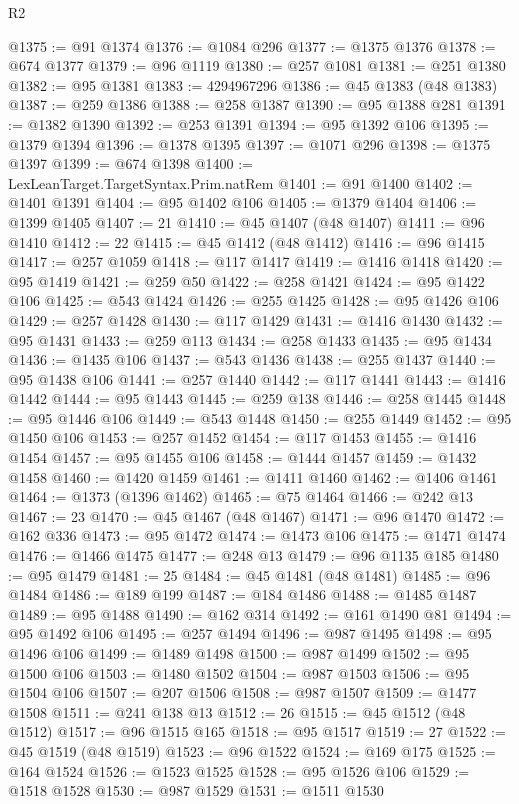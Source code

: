 \begin{lexlean}{R2}
\begin{coremodule}
@1375 := @91 @1374
@1376 := @1084 @296
@1377 := @1375 @1376
@1378 := @674 @1377
@1379 := @96 @1119
@1380 := @257 @1081
@1381 := @251 @1380
@1382 := @95 @1381
@1383 := 4294967296
@1386 := @45 @1383 (@48 @1383)
@1387 := @259 @1386
@1388 := @258 @1387
@1390 := @95 @1388 @281
@1391 := @1382 @1390
@1392 := @253 @1391
@1394 := @95 @1392 @106
@1395 := @1379 @1394
@1396 := @1378 @1395
@1397 := @1071 @296
@1398 := @1375 @1397
@1399 := @674 @1398
@1400 := LexLeanTarget.TargetSyntax.Prim.natRem
@1401 := @91 @1400
@1402 := @1401 @1391
@1404 := @95 @1402 @106
@1405 := @1379 @1404
@1406 := @1399 @1405
@1407 := 21
@1410 := @45 @1407 (@48 @1407)
@1411 := @96 @1410
@1412 := 22
@1415 := @45 @1412 (@48 @1412)
@1416 := @96 @1415
@1417 := @257 @1059
@1418 := @117 @1417
@1419 := @1416 @1418
@1420 := @95 @1419
@1421 := @259 @50
@1422 := @258 @1421
@1424 := @95 @1422 @106
@1425 := @543 @1424
@1426 := @255 @1425
@1428 := @95 @1426 @106
@1429 := @257 @1428
@1430 := @117 @1429
@1431 := @1416 @1430
@1432 := @95 @1431
@1433 := @259 @113
@1434 := @258 @1433
@1435 := @95 @1434
@1436 := @1435 @106
@1437 := @543 @1436
@1438 := @255 @1437
@1440 := @95 @1438 @106
@1441 := @257 @1440
@1442 := @117 @1441
@1443 := @1416 @1442
@1444 := @95 @1443
@1445 := @259 @138
@1446 := @258 @1445
@1448 := @95 @1446 @106
@1449 := @543 @1448
@1450 := @255 @1449
@1452 := @95 @1450 @106
@1453 := @257 @1452
@1454 := @117 @1453
@1455 := @1416 @1454
@1457 := @95 @1455 @106
@1458 := @1444 @1457
@1459 := @1432 @1458
@1460 := @1420 @1459
@1461 := @1411 @1460
@1462 := @1406 @1461
@1464 := @1373 (@1396 @1462)
@1465 := @75 @1464
@1466 := @242 @13
@1467 := 23
@1470 := @45 @1467 (@48 @1467)
@1471 := @96 @1470
@1472 := @162 @336
@1473 := @95 @1472
@1474 := @1473 @106
@1475 := @1471 @1474
@1476 := @1466 @1475
@1477 := @248 @13
@1479 := @96 @1135 @185
@1480 := @95 @1479
@1481 := 25
@1484 := @45 @1481 (@48 @1481)
@1485 := @96 @1484
@1486 := @189 @199
@1487 := @184 @1486
@1488 := @1485 @1487
@1489 := @95 @1488
@1490 := @162 @314
@1492 := @161 @1490 @81
@1494 := @95 @1492 @106
@1495 := @257 @1494
@1496 := @987 @1495
@1498 := @95 @1496 @106
@1499 := @1489 @1498
@1500 := @987 @1499
@1502 := @95 @1500 @106
@1503 := @1480 @1502
@1504 := @987 @1503
@1506 := @95 @1504 @106
@1507 := @207 @1506
@1508 := @987 @1507
@1509 := @1477 @1508
@1511 := @241 @138 @13
@1512 := 26
@1515 := @45 @1512 (@48 @1512)
@1517 := @96 @1515 @165
@1518 := @95 @1517
@1519 := 27
@1522 := @45 @1519 (@48 @1519)
@1523 := @96 @1522
@1524 := @169 @175
@1525 := @164 @1524
@1526 := @1523 @1525
@1528 := @95 @1526 @106
@1529 := @1518 @1528
@1530 := @987 @1529
@1531 := @1511 @1530

\end{coremodule}
\end{lexlean}
